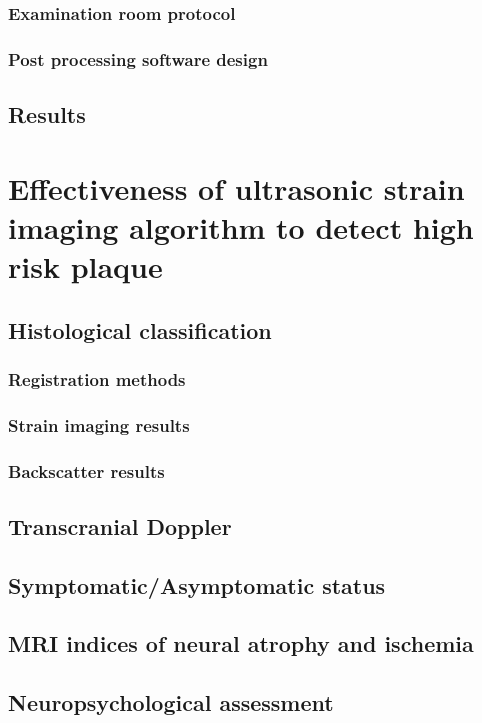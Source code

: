 \documentclass[12pt,twoside]{withesis}
\begin{document}
\subsection{Examination room protocol}
\subsection{Post processing software design}

\section{Results}


\chapter{Effectiveness of ultrasonic strain imaging algorithm to detect high
risk plaque}

\section{Histological classification}
\subsection{Registration methods}
\subsection{Strain imaging results}
\subsection{Backscatter results}

\section{Transcranial Doppler}

\section{Symptomatic/Asymptomatic status}

\section{MRI indices of neural atrophy and ischemia}

\section{Neuropsychological assessment}
\end{document}

